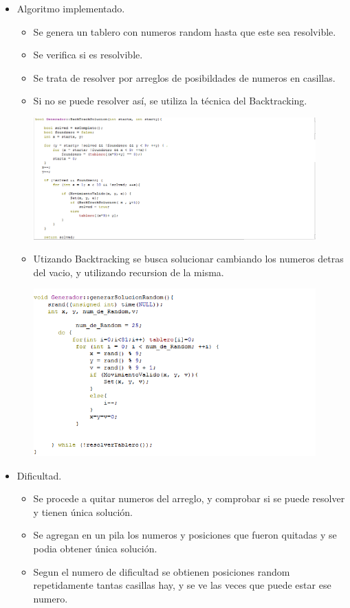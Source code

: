 \documentclass[12pt,oneside]{book}
\begin{document}
\begin{itemize}
\item  Algoritmo implementado.
\begin{itemize}
	\item Se genera un tablero con numeros random hasta que este sea resolvible.
	\item Se verifica si es resolvible.
	\item Se trata de resolver por arreglos de posibildades de numeros en casillas.
	\item Si no se puede resolver así, se utiliza la técnica del Backtracking. 

	\includegraphics[width=0.9\textwidth]{./imagenes/Codigo_backtrcking.png}

	\item Utizando Backtracking se busca solucionar cambiando los numeros detras del vacio, y utilizando recursion de la misma.

	\includegraphics[width=0.9\textwidth]{./imagenes/codigo_genrador.png}

\end {itemize}

\item  Dificultad.
\begin {itemize}
	\item Se procede a quitar numeros del arreglo, y comprobar si se puede resolver y tienen única solución.
	\item Se agregan en un pila los numeros y posiciones que fueron quitadas y se podia obtener única solución.
	\item Segun el numero de dificultad se obtienen posiciones random repetidamente tantas casillas hay, y se ve las veces 
	que puede estar ese numero.



\end{itemize}
\end{itemize}
\end{document}
